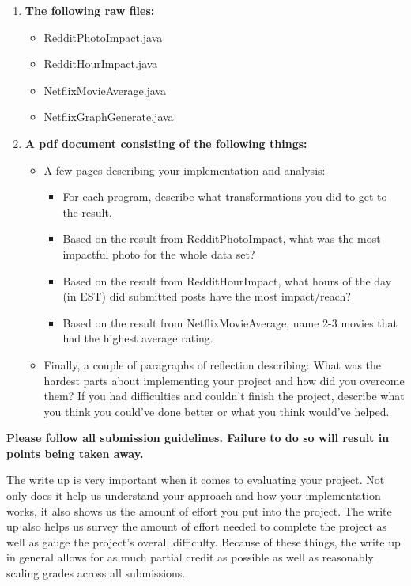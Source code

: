 \documentclass{article}
\begin{document}
\begin{enumerate}
\item \textbf{The following raw files:}
    \begin{itemize}
        \item RedditPhotoImpact.java
        \item RedditHourImpact.java
        \item NetflixMovieAverage.java
        \item NetflixGraphGenerate.java
    \end{itemize}
\item \textbf{A pdf document consisting of the following things:}
	\begin{itemize}
	\item A few pages describing your implementation and analysis:
	\begin{itemize}
	    \item For each program, describe what transformations you did to get to the result.
	    \item Based on the result from RedditPhotoImpact, what was the most impactful photo for the whole data set?
	    \item Based on the result from RedditHourImpact, what hours of the day (in EST) did submitted posts have the most impact/reach?
	    \item Based on the result from NetflixMovieAverage, name 2-3 movies that had the highest average rating.
	\end{itemize}
	\item  Finally, a couple of paragraphs of reflection describing: What was the hardest parts about implementing your project and how did you overcome them? If you had difficulties and couldn't finish the project, describe what you think you could've done better or what you think would've helped. 
	\end{itemize}
\end{enumerate}

\noindent \textbf{Please follow all submission guidelines. Failure to do so will result in points being taken away.}

\begin{info}
The write up is very important when it comes to evaluating your project. Not only does it help us understand your approach and how your implementation works, it also shows us the amount of effort you put into the project. The write up also helps us survey the amount of effort needed to complete the project as well as gauge the project's overall difficulty. Because of these things, the write up in general allows for as much partial credit as possible as well as reasonably scaling grades across all submissions.
\end{info}
\end{document}
